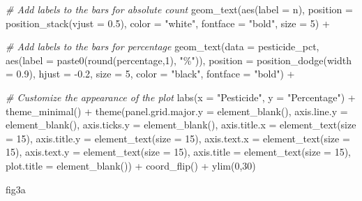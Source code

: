 \documentclass[
]{article}
\newenvironment{Shaded}{\begin{snugshade}}{\end{snugshade}}
\newcommand{\AttributeTok}[1]{\textcolor[rgb]{0.77,0.63,0.00}{#1}}
\newcommand{\CommentTok}[1]{\textcolor[rgb]{0.56,0.35,0.01}{\textit{#1}}}
\newcommand{\DecValTok}[1]{\textcolor[rgb]{0.00,0.00,0.81}{#1}}
\newcommand{\FloatTok}[1]{\textcolor[rgb]{0.00,0.00,0.81}{#1}}
\newcommand{\FunctionTok}[1]{\textcolor[rgb]{0.00,0.00,0.00}{#1}}
\newcommand{\NormalTok}[1]{#1}
\newcommand{\SpecialCharTok}[1]{\textcolor[rgb]{0.00,0.00,0.00}{#1}}
\newcommand{\StringTok}[1]{\textcolor[rgb]{0.31,0.60,0.02}{#1}}
\begin{document}
\begin{Shaded}
\begin{Highlighting}[]
  \CommentTok{\# Add labels to the bars for absolute count }
  \FunctionTok{geom\_text}\NormalTok{(}\FunctionTok{aes}\NormalTok{(}\AttributeTok{label =}\NormalTok{ n), }\AttributeTok{position =} \FunctionTok{position\_stack}\NormalTok{(}\AttributeTok{vjust =} \FloatTok{0.5}\NormalTok{), }\AttributeTok{color =} \StringTok{"white"}\NormalTok{, }\AttributeTok{fontface =} \StringTok{"bold"}\NormalTok{, }\AttributeTok{size =} \DecValTok{5}\NormalTok{) }\SpecialCharTok{+}
  

  \CommentTok{\# Add labels to the bars for percentage }
 \FunctionTok{geom\_text}\NormalTok{(}\AttributeTok{data =}\NormalTok{ pesticide\_pct, }\FunctionTok{aes}\NormalTok{(}\AttributeTok{label =} \FunctionTok{paste0}\NormalTok{(}\FunctionTok{round}\NormalTok{(percentage,}\DecValTok{1}\NormalTok{), }\StringTok{"\%"}\NormalTok{)), }
            \AttributeTok{position =} \FunctionTok{position\_dodge}\NormalTok{(}\AttributeTok{width =} \FloatTok{0.9}\NormalTok{), }\AttributeTok{hjust =} \SpecialCharTok{{-}}\FloatTok{0.2}\NormalTok{, }\AttributeTok{size =} \DecValTok{5}\NormalTok{, }\AttributeTok{color =} \StringTok{"black"}\NormalTok{, }\AttributeTok{fontface =} \StringTok{"bold"}\NormalTok{) }\SpecialCharTok{+}
  
  \CommentTok{\# Customize the appearance of the plot}
  \FunctionTok{labs}\NormalTok{(}\AttributeTok{x =} \StringTok{"Pesticide"}\NormalTok{, }\AttributeTok{y =} \StringTok{"Percentage"}\NormalTok{) }\SpecialCharTok{+}
  \FunctionTok{theme\_minimal}\NormalTok{() }\SpecialCharTok{+}
  \FunctionTok{theme}\NormalTok{(}\AttributeTok{panel.grid.major.y =} \FunctionTok{element\_blank}\NormalTok{(),}
        \AttributeTok{axis.line.y =} \FunctionTok{element\_blank}\NormalTok{(),}
        \AttributeTok{axis.ticks.y =} \FunctionTok{element\_blank}\NormalTok{(),}
        \AttributeTok{axis.title.x =} \FunctionTok{element\_text}\NormalTok{(}\AttributeTok{size =} \DecValTok{15}\NormalTok{),}
        \AttributeTok{axis.title.y =} \FunctionTok{element\_text}\NormalTok{(}\AttributeTok{size =} \DecValTok{15}\NormalTok{),}
        \AttributeTok{axis.text.x =} \FunctionTok{element\_text}\NormalTok{(}\AttributeTok{size =} \DecValTok{15}\NormalTok{),}
        \AttributeTok{axis.text.y =} \FunctionTok{element\_text}\NormalTok{(}\AttributeTok{size =} \DecValTok{15}\NormalTok{),}
        \AttributeTok{axis.title =} \FunctionTok{element\_text}\NormalTok{(}\AttributeTok{size =} \DecValTok{15}\NormalTok{),}
        \AttributeTok{plot.title =} \FunctionTok{element\_blank}\NormalTok{()) }\SpecialCharTok{+}
        \FunctionTok{coord\_flip}\NormalTok{() }\SpecialCharTok{+}
        \FunctionTok{ylim}\NormalTok{(}\DecValTok{0}\NormalTok{,}\DecValTok{30}\NormalTok{)}


\NormalTok{ fig3a}
\end{Highlighting}
\end{Shaded}
\end{document}
